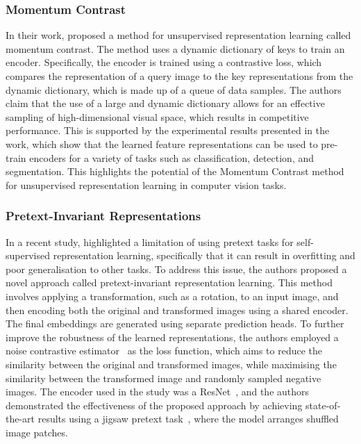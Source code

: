 \subsubsection{Momentum Contrast}
\label{subsubsec:momentum_contrast}
In their work, \cite{he2020momentum} proposed a method for unsupervised representation learning called momentum contrast. The method uses a dynamic dictionary of keys to train an encoder. Specifically, the encoder is trained using a contrastive loss, which compares the representation of a query image to the key representations from the dynamic dictionary, which is made up of a queue of data samples. The authors claim that the use of a large and dynamic dictionary allows for an effective sampling of high-dimensional visual space, which results in competitive performance. This is supported by the experimental results presented in the work, which show that the learned feature representations can be used to pre-train encoders for a variety of tasks such as classification, detection, and segmentation. This highlights the potential of the Momentum Contrast method for unsupervised representation learning in computer vision tasks.

\subsubsection{Pretext-Invariant Representations}
\label{subsubsec:pretext_invariant_representations}
In a recent study, \cite{misra2020self} highlighted a limitation of using pretext tasks for self-supervised representation learning, specifically that it can result in overfitting and poor generalisation to other tasks. To address this issue, the authors proposed a novel approach called pretext-invariant representation learning. This method involves applying a transformation, such as a rotation, to an input image, and then encoding both the original and transformed images using a shared encoder. The final embeddings are generated using separate prediction heads. To further improve the robustness of the learned representations, the authors employed a noise contrastive estimator~\citep{gutmann2010noise} as the loss function, which aims to reduce the similarity between the original and transformed images, while maximising the similarity between the transformed image and randomly sampled negative images. The encoder used in the study was a ResNet~\citep{he2016deep}, and the authors demonstrated the effectiveness of the proposed approach by achieving state-of-the-art results using a jigsaw pretext task~\citep{noroozi2016unsupervised}, where the model arranges shuffled image patches.


